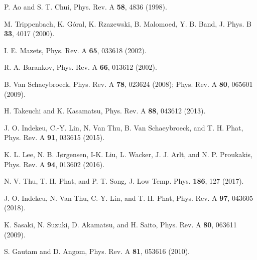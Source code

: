 \documentclass[pra,aps,superscriptaddress,twocolumn,color]{revtex4-1}
\begin{document}
\begin{thebibliography}{99}
P. Ao and S. T. Chui,
Phys. Rev. A \textbf{58}, 4836 (1998).

M. Trippenbach, K. G\'oral, K. Rzazewski, B. Malomoed, Y. B. Band,
J. Phys. B \textbf{33}, 4017 (2000).

I. E. Mazets,
Phys. Rev. A \textbf{65}, 033618 (2002).

R. A. Barankov,
Phys. Rev. A \textbf{66}, 013612 (2002).

B. Van Schaeybroeck,
Phys. Rev. A \textbf{78}, 023624 (2008);
Phys. Rev. A \textbf{80}, 065601 (2009).

H. Takeuchi and K. Kasamatsu,
Phys. Rev. A \textbf{88}, 043612 (2013).

J. O. Indekeu, C.-Y. Lin, N. Van Thu, B. Van Schaeybroeck, and T. H. Phat,
Phys. Rev. A \textbf{91}, 033615 (2015).

K. L. Lee, N. B. J\o rgensen, I-K. Liu, L. Wacker, J. J. Arlt, and
N. P. Proukakis,
Phys. Rev. A \textbf{94}, 013602 (2016).

N. V. Thu, T. H. Phat, and P. T. Song,
J. Low Temp. Phys. \textbf{186}, 127 (2017).

J. O. Indekeu, N. Van Thu, C.-Y. Lin, and T. H. Phat,
Phys. Rev. A \textbf{97}, 043605 (2018).

K. Sasaki, N. Suzuki, D. Akamatsu, and H. Saito,
Phys. Rev. A \textbf{80}, 063611 (2009).

S. Gautam and D. Angom,
Phys. Rev. A \textbf{81}, 053616 (2010).


\end{thebibliography}
\end{document}
